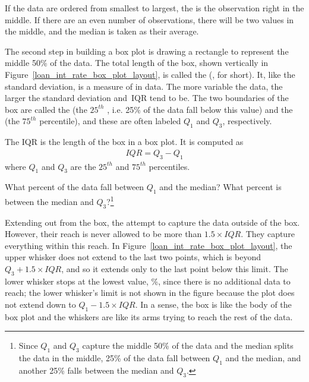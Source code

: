 \begin{termBox}{
  If the data are ordered from smallest to largest,
  the  is the observation right in the middle.
  If there are an even number of observations,
  there will be two values in the middle,
  and the median is taken as their average.}
\end{termBox}

The second step in building a box plot is drawing
a rectangle to represent the middle 50\% of the data.
The total length of the box, shown vertically in
Figure~\ref{loan_int_rate_box_plot_layout},
is called the  (,
for short).
It, like the standard deviation, is a measure
of  in data.
The more variable the data, the larger the standard
deviation and~IQR tend to be.
The two boundaries of the box are called the
 
(the $25^{th}$ ,
i.e. 25\% of the data fall below this value)
and the  
(the $75^{th}$ percentile), and these are often labeled $Q_1$
 and $Q_3$, respectively.

\begin{termBox}{
  The IQR is the length
  of the box in a box plot.
  It is computed as
  \begin{eqnarray*}
  IQR = Q_3 - Q_1
  \end{eqnarray*}
  where $Q_1$ and $Q_3$ are the $25^{th}$ and $75^{th}$
  percentiles.}
\end{termBox}

\begin{exercise}
What percent of the data fall between $Q_1$ and the median?
What percent is between the median and $Q_3$?\footnote{Since
  $Q_1$ and $Q_3$ capture the middle 50\% of the data and
  the median splits the data in the middle, 25\% of the data
  fall between $Q_1$ and the median, and another 25\% falls
  between the median and $Q_3$.}
\end{exercise}

Extending out from the box, the  attempt
to capture the data outside of the box.
However, their reach is never allowed to be more than
$1.5\times IQR$.
They capture everything within this reach.
In Figure~\ref{loan_int_rate_box_plot_layout},
the upper whisker does not extend to the last two points,
which is beyond $Q_3 + 1.5\times IQR$,
and so it extends only to the last point below this limit.
The lower whisker stops at the lowest value,
\loanSmallestValue{}\%,
since there is no additional data to reach;
the lower whisker's limit is not shown in the figure because
the plot does not extend down to $Q_1 - 1.5\times IQR$.
In a sense, the box is like the body of the box plot
and the whiskers are like its arms trying to reach the
rest of the data.

